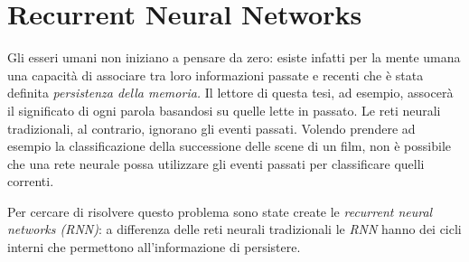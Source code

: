 \documentclass[a4paper,12pt,openright,twoside]{report}
\theoremstyle{definition}
\begin{document}





\section{Recurrent Neural Networks}
Gli esseri umani non iniziano a pensare da zero: esiste infatti per la mente umana una capacità di 
associare tra loro informazioni passate e recenti che è stata definita \emph{persistenza della memoria.} 
Il lettore di questa tesi, ad esempio, assocerà il significato di ogni parola basandosi su quelle 
lette in passato.
Le reti neurali tradizionali, al contrario, ignorano gli eventi passati. Volendo prendere ad esempio 
la classificazione della successione delle scene di un film, non è possibile che una rete neurale 
possa utilizzare gli eventi passati per classificare quelli correnti.

Per cercare di risolvere questo problema sono state create le \emph{recurrent neural networks (RNN)}:
a differenza delle reti neurali tradizionali le \emph{RNN} hanno dei cicli interni che permettono
all'informazione di persistere.
\end{document}
